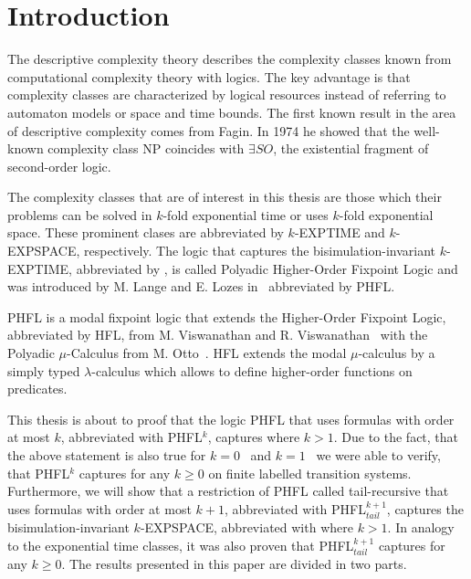 \chapter{Introduction}\label{ch:introduction}

The descriptive complexity theory describes the complexity classes known from computational complexity theory with logics. The key advantage is that complexity classes are characterized by logical resources instead of referring to automaton models or space and time bounds. The first known result in the area of descriptive complexity comes from Fagin. In 1974 he showed that the well-known complexity class NP coincides with $\exists SO$, the existential fragment of second-order logic. 

The complexity classes that are of interest in this thesis are those which their problems can be solved in $k$-fold exponential time or uses $k$-fold exponential space. These prominent clases are abbreviated by $k$-EXPTIME and $k$-EXPSPACE, respectively. The logic that captures the bisimulation-invariant $k$-EXPTIME, abbreviated by , is called Polyadic Higher-Order Fixpoint Logic and was introduced by M. Lange and E. Lozes in~\cite{lange2014capturing} abbreviated by PHFL. 

PHFL is a modal fixpoint logic that extends the Higher-Order Fixpoint Logic, abbreviated by HFL, from M. Viswanathan and R. Viswanathan~\cite{viswanathan2004higher} with the Polyadic $\mu$-Calculus from M. Otto~\cite{otto1999bisimulation}. HFL extends the modal $\mu$-calculus by a simply typed $\lambda$-calculus which allows to define higher-order functions on predicates.

This thesis is about to proof that the logic PHFL that uses formulas with order at most $k$, abbreviated with PHFL$^k$, captures  where $k > 1$. Due to the fact, that the above statement is also true for $k = 0$~\cite{otto1999bisimulation} and $k = 1$~\cite{lange2014capturing} we were able to verify, that PHFL$^k$ captures  for any $k \geq 0$ on finite labelled transition systems. Furthermore, we will show that a restriction of PHFL called tail-recursive that uses formulas with order at most $k+1$, abbreviated with PHFL$^{k+1}_{tail}$, captures the bisimulation-invariant $k$-EXPSPACE, abbreviated with  where $k > 1$. In analogy to the exponential time classes, it was also proven that PHFL$^{k+1}_{tail}$ captures  for any $k \geq 0$. The results presented in this paper are divided in two parts. 

